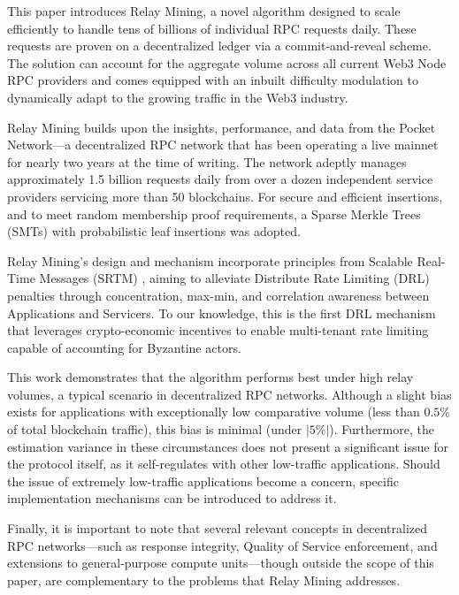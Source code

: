 \documentclass[runningheads]{llncs}
\begin{document}
This paper introduces Relay Mining, a novel algorithm designed to scale efficiently to handle tens of billions of individual RPC requests daily. These requests are proven on a decentralized ledger via a commit-and-reveal scheme. The solution can account for the aggregate volume across all current Web3 Node RPC providers and comes equipped with an inbuilt difficulty modulation to dynamically adapt to the growing traffic in the Web3 industry.

Relay Mining builds upon the insights, performance, and data from the Pocket Network—a decentralized RPC network that has been operating a live mainnet for nearly two years at the time of writing. The network adeptly manages approximately 1.5 billion requests daily from over a dozen independent service providers servicing more than 50 blockchains. For secure and efficient insertions, and to meet random membership proof requirements, a Sparse Merkle Trees (SMTs) with probabilistic leaf insertions was adopted.

Relay Mining's design and mechanism incorporate principles from Scalable Real-Time Messages (SRTM) \cite{wustl2021drl}, aiming to alleviate Distribute Rate Limiting (DRL) penalties through concentration, max-min, and correlation awareness between Applications and Servicers. To our knowledge, this is the first DRL mechanism that leverages crypto-economic incentives to enable multi-tenant rate limiting capable of accounting for Byzantine actors.

This work demonstrates that the algorithm performs best under high relay volumes, a typical scenario in decentralized RPC networks. Although a slight bias exists for applications with exceptionally low comparative volume (less than $0.5\%$ of total blockchain traffic), this bias is minimal (under $|5\%|$). Furthermore, the estimation variance in these circumstances does not present a significant issue for the protocol itself, as it self-regulates with other low-traffic applications. Should the issue of extremely low-traffic applications become a concern, specific implementation mechanisms can be introduced to address it.

Finally, it is important to note that several relevant concepts in decentralized RPC networks—such as response integrity, Quality of Service enforcement, and extensions to general-purpose compute units—though outside the scope of this paper, are complementary to the problems that Relay Mining addresses.


\end{document}
